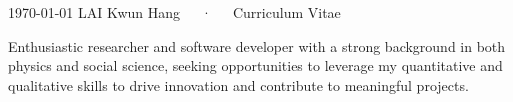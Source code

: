 \documentclass[11pt, a4paper]{awesome-cv}
\begin{document}
\makecvheader

\makecvfooter
  {\today}
  {LAI Kwun Hang~~~·~~~Curriculum Vitae}
  {\thepage}

\vspace{1em}
Enthusiastic researcher and software developer with a strong background in both physics and social science, seeking opportunities to leverage my quantitative and qualitative skills to drive innovation and contribute to meaningful projects.







%

%
%
%
%


\end{document}
